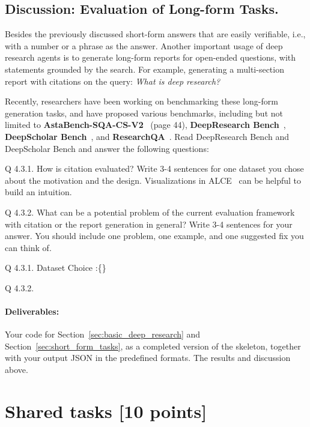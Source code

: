 \documentclass{article}
\begin{document}
\subsection{Discussion: Evaluation of Long-form Tasks.}
Besides the previously discussed short-form answers that are easily verifiable, i.e., with a number or a phrase as the answer. Another important usage of deep research agents is to generate long-form reports for open-ended questions, with statements grounded by the search. For example, generating a multi-section report with citations on the query: \textit{What is deep research?}

Recently, researchers have been working on benchmarking these long-form generation tasks, and have proposed various benchmarks, including but not limited to \textbf{AstaBench-SQA-CS-V2}~\cite{bragg2025astabench} (page 44), \textbf{DeepResearch Bench}~\cite{du2025deepresearch}, \textbf{DeepScholar Bench}~\cite{patel2025deepscholarbench}, and \textbf{ResearchQA}~\cite{yifei2025researchqa}. Read DeepResearch Bench and DeepScholar Bench and answer the following questions:

Q 4.3.1. How is citation evaluated? Write 3-4 sentences for one dataset you chose about the motivation and the design. Visualizations in ALCE~\cite{gao2023enabling} can be helpful to build an intuition.

Q 4.3.2. What can be a potential problem of the current evaluation framework with citation or the report generation in general?  Write 3-4 sentences for your answer. You should include one problem, one example, and one suggested fix you can think of.



\begin{solve}

Q 4.3.1. Dataset Choice :\{\}


Q 4.3.2.
\end{solve}

\paragraph{Deliverables:} Your code for Section~\ref{sec:basic_deep_research} and Section~\ref{sec:short_form_tasks}, as a completed version of the skeleton, together with your output JSON in the predefined formats. The results and discussion above. 


\clearpage
\section{Shared tasks [10 points]}
\end{document}
